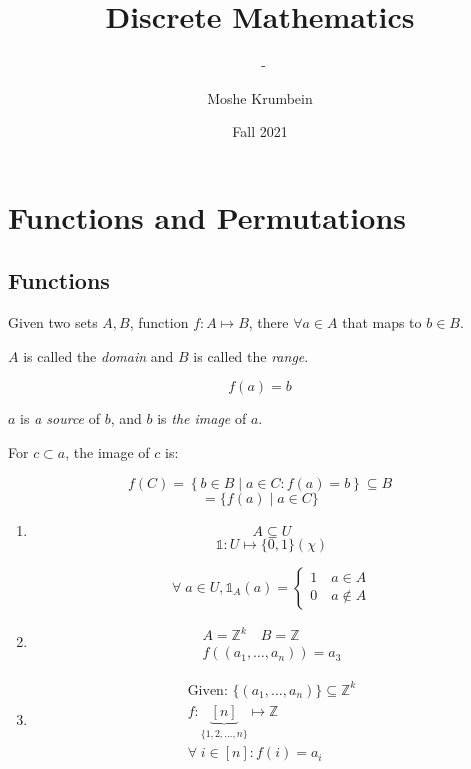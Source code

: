 \documentclass[00_complete]{subfiles}
\title{Discrete Mathematics}
\author{Moshe Krumbein}
\date{Fall 2021}
\begin{document}
\setcounter{chapter}{1}

\chapter{Functions and Permutations}
\subtitle{\theauthor~- \thedate}

\section{Functions}

Given two sets $A, B$, function $f: A \mapsto B$, there $\forall a
\in A$ that maps to $b \in B$.

$A$ is called the \emph{domain} and $B$ is called the \emph{range}.

$$f(a)=b$$

$a$ is \emph{a source} of $b$, and $b$ is \emph{the image} of $a$.

For $c \subset a$, the image of $c$ is:

$$f(C) = \left\{b \in B \mid a \in C : f(a) = b \right\} \subseteq B$$
$$=\{f(a) \mid a \in C\}$$

\begin{example}
\begin{enumerate}
Given $f: A \mapsto B$:

$$\Im f = f(A) \subseteq B$$

Given $D \subseteq B$, the source of $D$:

$$ f^{-1}(D) = \{a \in A \mid f(a) \in D\}$$

\item
$$A \subseteq U$$
$$\mathbb{1}: U \mapsto \{0,1\} (\chi)$$

$$\forall \; a \in U, \mathbb{1}_A(a) = \begin{cases}
    1 \quad a \in A \\
    0 \quad a \notin A
\end{cases}$$

\item
$$
\begin{gathered}
    A = \mathbb{Z}^k \quad B = \mathbb{Z} \\
    f((a_1, \ldots, a_n)) = a_3
\end{gathered}
$$

\item
$$
\begin{gathered}
    \text{Given: }\{(a_1, \ldots, a_n)\} \subseteq \mathbb{Z}^k \\
    f: \underbrace{[n]}_{\{1,2,\ldots,n\}} \mapsto \mathbb{Z} \\
    \forall \; i \in [n] : f(i)= a_i
\end{gathered}
$$

\end{enumerate}
\end{example}
\end{document}
